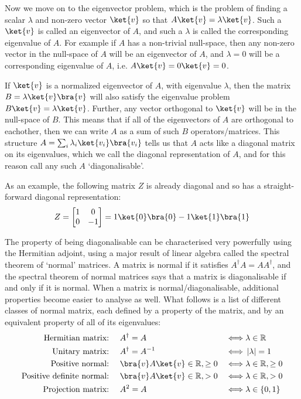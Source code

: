 Now we move on to the eigenvector problem, which is the problem of finding a scalar $\lambda$ and non-zero vector $\ket{v}$ so that $A\ket{v}=\lambda\ket{v}$. Such a $\ket{v}$ is called an eigenvector of $A$, and such a $\lambda$ is called the corresponding eigenvalue of $A$. For example if $A$ has a non-trivial null-space, then any non-zero vector in the null-space of $A$ will be an eigenvector of $A$, and $\lambda=0$ will be a corresponding eigenvalue of $A$, i.e. $A\ket{v} = 0\ket{v} = 0$.

If $\ket{v}$ is a normalized eigenvector of $A$, with eigenvalue $\lambda$, then the matrix $B=\lambda\ket{v}\bra{v}$ will also satisfy the eigenvalue problem $B\ket{v}=\lambda\ket{v}$. Further, any vector orthogonal to $\ket{v}$ will be in the null-space of $B$. This means that if all of the eigenvectors of $A$ are orthogonal to eachother, then we can write $A$ as a sum of such $B$ operators/matrices. This structure $A = \sum_i \lambda_i \ket{v_i}\bra{v_i}$ tells us that $A$ acts like a diagonal matrix on its eigenvalues, which we call the diagonal representation of $A$, and for this reason call any such $A$ `diagonalisable'.

As an example, the following matrix $Z$ is already diagonal and so has a straight-forward diagonal representation:
\begin{align*}
	Z = \left[\begin{matrix}
		1&0\\
		0&-1
	\end{matrix}\right] = 1\ket{0}\bra{0} - 1\ket{1}\bra{1}
\end{align*}

The property of being diagonalisable can be characterised very powerfully using the Hermitian adjoint, using a major result of linear algebra called the spectral theorem of `normal' matrices. A matrix is normal if it satisfies $A^\dagger A = AA^\dagger$, and the spectral theorem of normal matrices says that a matrix is diagonalisable if and only if it is normal. When a matrix is normal/diagonalisable, additional properties become easier to analyse as well. What follows is a list of different classes of normal matrix, each defined by a property of the matrix, and by an equivalent property of all of its eigenvalues:
\begin{align*}
	\text{Hermitian matrix:\ }&&& A^\dagger = A & \iff& \lambda \in \mathbb{R} \\
	\text{Unitary matrix:\ }&&& A^\dagger = A^{-1} & \iff& \ord{\lambda}=1 \\
	\text{Positive normal:\ }&&& \bra{v}A\ket{v} \in \mathbb{R}, \geq 0 & \iff& \lambda \in \mathbb{R}, \geq 0 \\
	\text{Positive definite normal:\ }&&& \bra{v}A\ket{v} \in \mathbb{R}, > 0 & \iff& \lambda \in \mathbb{R}, > 0 \\
	\text{Projection matrix:\ }&&& A^2 = A & \iff& \lambda \in \{0, 1\} \\
\end{align*}

